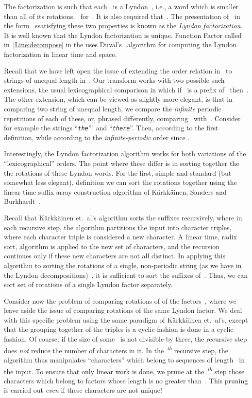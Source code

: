 \documentclass[a4paper,12pt]{article}
\newcommand{\str}[1]{{\textit{\texttt{#1}}}}
\newcommand{\alg}[1]{{\textup{\textsf{#1}}}}
\numberwithin{algorithm}{section}
\begin{document}
The factorization 
 is such that each~ is a Lyndon~\cite{Lyndon:54},
  i.e., a word which  is smaller than all of its rotations,~ for~.
It is also required that~.
The  presentation of~ in the
  form~ ssatisfying these two properties is known as the \emph{Lyndon factorization}.
It is well known that the Lyndon factorization  is unique.
Function \alg{Factor} called in~\ref{Line:decompose} in the  uses
  Duval's~\cite{Duval:83}.algorithm for computing the Lyndon factorization in linear time and space.

Recall that we have left open the issue of extending the order relation in~ to
  strings of unequal length in~.
Our transform works with two possible such extensions, the usual lexicographical    comparison
  in which if~ is a prefix of~ then~.
The other extension, which can be viewed as slightly more elegant, is
  that in comparing two string of unequal length,
  we compare the \emph{infinite} periodic repetitions of  each of these,
  or, phrased differently,
  comparing~ with~.
Consider for example the strings  “\str{the}''' and “\str{there}''.
Then,   according to the first definition,
  while   according to the \emph{infinite-periodic}
  order
  since .

Interestingly, the Lyndon factorization algorithm works for both
  variations of the “lexicographical'' orders.
The point where these differ is in sorting together the
  the rotations of these Lyndon words.
For the first, simple and standard (but somewhat less elegant), definition
  we can sort the rotations together using the linear time suffix array construction algorithm of Kärkkäinen, Sanders and
  Burkhardt~\cite{Karkkainen:Sanders:Burkhardt:06}.

Recall that Kärkkäinen et.\ al's  algorithm sorts the suffixes recursively, where in
  each recursive step, the algorithm partitions the input into character triples,
  where each character triple is considered a new character.
A linear time, radix sort, algorithm is applied to the new set of characters,
  and the recursion continues only if these new characters are not all distinct.
In applying this algorithm to sorting the rotations of a single, non-periodic
  string (as we have in the Lyndon decompositions)~,
  it is sufficient to sort the suffixes of~.
Thus, we can sort set of rotations of a single Lyndon factor
  separately.

Consider now the problem of comparing rotations of
  of the factors~, where we
  leave aside the issue of comparing rotations of the same Lyndon factor.
We deal with this specific problem using the same paradigm
  of  Kärkkäinen et.\ al's, except that the grouping together of the
  triples is a cyclic fashion is done in a cyclic fashion.
Of course, if the size of some~ is not divisible by three,
  the recursive step does \emph{not} reduce the number
  of characters in it.
In the~\textsuperscript{\emph{th}} recursive step, the algorithm thus
  manipulates “characters'' which belong to sequences of length~
  in the input.
To ensure that only linear work is done, we prune at the~\textsuperscript{\emph{th}}
  step those characters which belong to factors whose length is no greater than~.
This pruning is carried out \emph{even} if these characters are not unique!
\end{document}
